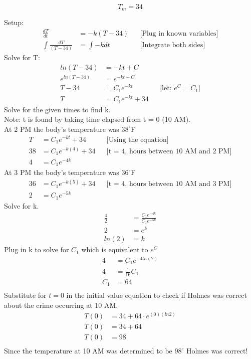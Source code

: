 \documentclass{article}
\begin{document}
\begin{flushleft}
{\[ T_m = 34 \]

Setup:
\begin{align*}
\frac{dT}{dt} & = -k(T-34) && \text{[Plug in known variables]}\\
\int \frac{dT}{(T-34)} & = \int -kdt && \text{[Integrate both sides]}
\end{align*}
\bigskip
Solve for T:\\
\begin{align*}
ln(T - 34) & =  -kt + C \\
e^{ln(T - 34)} & = e^{-kt + C} \\
T - 34 & = C_1e^{-kt} && \text{[let: $e^C = C_1$]}\\
T & = C_1e^{-kt} +34
\end{align*}
Solve for the given times to find k. \\
Note: t is found by taking time elapsed from t = 0 (10 AM).\\
At 2 PM the body's temperature was $38^{\circ}$F\\
\begin{align*}
T & = C_1e^{-kt} + 34 && \text{[Using the equation]} \\
38 & = C_1e^{-k(4)} + 34 && \text{[t = 4, hours between 10 AM and  2 PM]} \\
4 & = C_1e^{-4k}
\end{align*}
At 3 PM the body's temperature was $36^{\circ}$F\\
\begin{align*}
36 & = C_1e^{-k(5)} + 34 && \text{[t = 4, hours between 10 AM and  3 PM]} \\
2 & = C_1e^{-5k}
\end{align*}
Solve for k.\\
\begin{align*}
\frac{4}{2} & = \frac{C_1e^{-4k}}{C_1e^{-5k}}\\
2 & = e^k\\
ln(2) & = k
\end{align*}
Plug in k to solve for $C_1$ which is equivalent to $e^C$
\begin{align*}
4 & = C_1e^{-4ln(2)} \\
4 & = \frac{1}{16}C_1 \\
C_1 & = 64 \\
\end{align*}
Substitute for $t = 0$ in the initial value equation to check if Holmes was correct about the crime occurring at 10 AM.
\begin{align*}
T(0) & = 34 + 64 \cdot e^{(0)(ln2)}\\
T(0) & = 34 + 64\\
T(0) & = 98 \\
\end{align*}
\bigskip
Since the temperature at 10 AM was determined to be $98^{\circ}$ Holmes was correct!\\

}
\end{flushleft}
\end{document}
